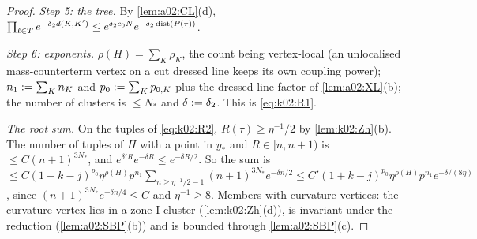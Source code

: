 \begin{proof}
\emph{Step 5: the tree.} By \cref{lem:a02:CL}(d), $\prod_{\ell\in T}e^{-\delta_2d(K,K')}\le e^{\delta_2c_0N}e^{-\delta_2\operatorname{dist}(P(\tau))}$.

\emph{Step 6: exponents.} $\rho(H)=\sum_K\rho_K$, the count being vertex-local (an unlocalised mass-counterterm vertex on a cut dressed line keeps its own coupling power); $n_1:=\sum_Kn_K$ and $p_0:=\sum_Kp_{0,K}$ plus the dressed-line factor of \cref{lem:a02:XL}(b); the number of clusters is $\le N_*$ and $\delta:=\delta_2$. This is \eqref{eq:k02:R1}.

\emph{The root sum.} On the tuples of \eqref{eq:k02:R2}, $R(\tau)\ge\eta^{-1}/2$ by \cref{lem:k02:Zh}(b). The number of tuples of $H$ with a point in $y_*$ and $R\in[n,n+1)$ is $\le C(n+1)^{3N_*}$, and $e^{\delta'R}e^{-\delta R}\le e^{-\delta R/2}$. So the sum is $\le C(1+k-j)^{p_0}\eta^{\rho(H)}p^{n_1}\sum_{n\ge\eta^{-1}/2-1}(n+1)^{3N_*}e^{-\delta n/2}\le C'(1+k-j)^{p_0}\eta^{\rho(H)}p^{n_1}e^{-\delta/(8\eta)}$, since $(n+1)^{3N_*}e^{-\delta n/4}\le C$ and $\eta^{-1}\ge8$. Members with curvature vertices: the curvature vertex lies in a zone-I cluster (\cref{lem:k02:Zh}(d)), is invariant under the reduction (\cref{lem:a02:SBP}(b)) and is bounded through \cref{lem:a02:SBP}(c).
\end{proof}

